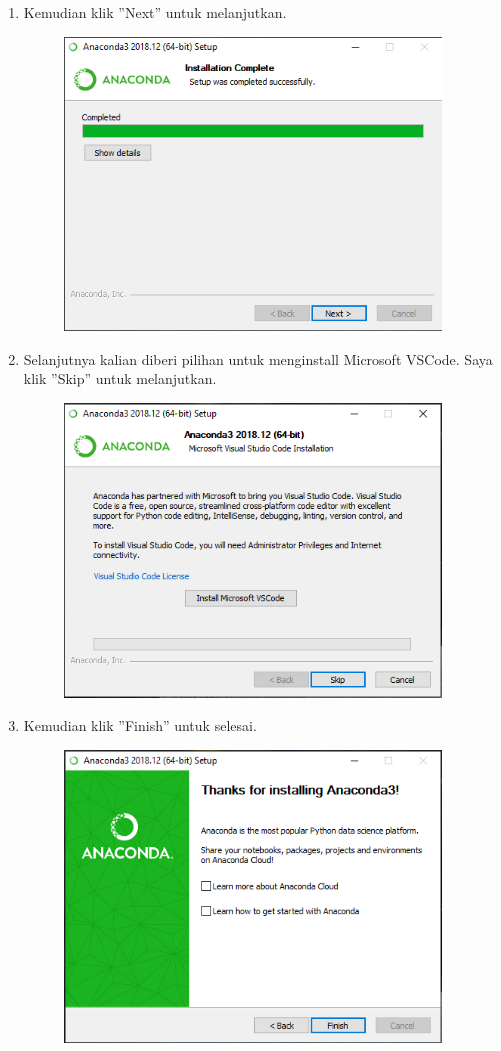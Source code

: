 \begin{enumerate}
	\item Kemudian klik ''Next'' untuk melanjutkan.
	\begin{figure}[H]
		\includegraphics[width=10cm]{figures/diva/7chp1diva.png}
		\centering
	\end{figure}

	\item Selanjutnya kalian diberi pilihan untuk menginstall Microsoft VSCode. Saya klik ''Skip'' untuk melanjutkan.
	\begin{figure}[H]
		\includegraphics[width=10cm]{figures/diva/8chp1diva.png}
		\centering
	\end{figure}

	\item Kemudian klik ''Finish'' untuk selesai.
	\begin{figure}[H]
		\includegraphics[width=10cm]{figures/diva/9chp1diva.png}
		\centering
	\end{figure}


\end{enumerate}
